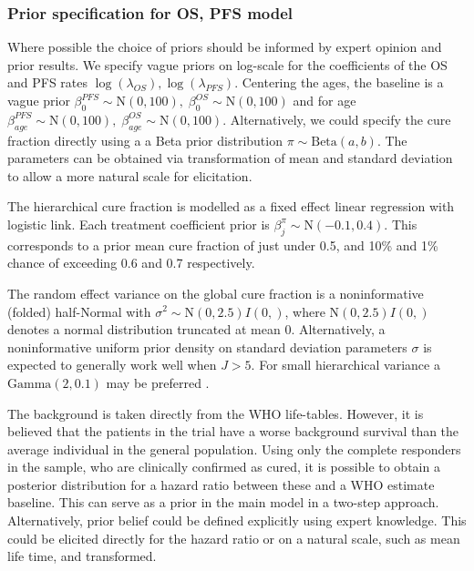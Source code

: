 \documentclass[AMA,STIX1COL]{WileyNJD-v2}
\begin{document}
\subsubsection{Prior specification for OS, PFS model}
Where possible the choice of priors should be informed by expert opinion and prior results.
We specify vague priors on log-scale for the coefficients of the OS and PFS rates $\log(\lambda_{OS}),  \log(\lambda_{PFS})$.
Centering the ages, the baseline is a vague prior ${\beta_0^{PFS} \sim \text{N}(0, 100),}\; {\beta_0^{OS} \sim \text{N}(0, 100)}$
and for age $\beta_{age}^{PFS} \sim \text{N}(0, 100),\; \beta_{age}^{OS} \sim \text{N}(0, 100)$.
Alternatively, we could specify the cure fraction directly using a a Beta prior distribution $\pi \sim \text{Beta}(a, b)$.
The parameters can be obtained via transformation of mean and standard deviation to allow a more natural scale for elicitation.

The hierarchical cure fraction is modelled as a fixed effect linear regression with logistic link. Each treatment coefficient prior is $\beta^{\pi}_j \sim \text{N}(-0.1, 0.4)$.
This corresponds to a prior mean cure fraction of just under 0.5, and 10\% and 1\% chance of exceeding 0.6 and 0.7 respectively.  

The random effect variance on the global cure fraction is a noninformative (folded) half-Normal \cite{Gelman2006} with 
${\sigma^2 \sim \text{N}(0, 2.5)I(0,)}$, where $\text{N}(0, 2.5)I(0,)$ denotes a normal distribution truncated at mean 0.
Alternatively, a noninformative uniform prior density on standard deviation parameters $\sigma$ is expected to generally work well when $J > 5$.
For small hierarchical variance a $\text{Gamma}(2, 0.1)$ may be preferred \cite{Chung2013}.


The background is taken directly from the WHO life-tables.
However, it is believed that the patients in the trial have a worse background survival than the average individual in the general population.
Using only the complete responders in the sample, who are clinically confirmed as cured, it is possible to obtain a posterior distribution for a hazard ratio between these and a WHO estimate baseline.
This can serve as a prior in the main model in a two-step approach.
Alternatively, prior belief could be defined explicitly using expert knowledge.
This could be elicited directly for the hazard ratio or on a natural scale, such as mean life time, and transformed.
\end{document}
